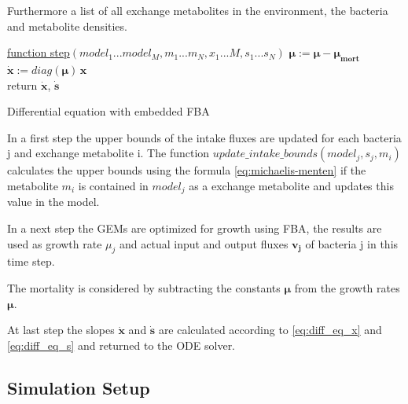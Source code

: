\documentclass[a4paper,10pt]{article}
\begin{document}
Furthermore a list of all exchange metabolites in the environment, the bacteria and metabolite densities.


\begin{algorithm}

    \underline{function step}$(model_1...model_M, m_1...m_N, x_1...M, s_1...s_N)$\;
    $\bm{\mu} := \bm{\mu} - \bm{\mu_{mort}}$\\
    $\dot{\bm{x}} := diag(\bm{\mu}) \, \bm{x}$\\
    return $\dot{\bm{x}}$, $\dot{\bm{s}}$
    \caption{Differential equation with embedded FBA}
    \label{alg:differential_equation_with_embedded_fba}
\end{algorithm}

In a first step the upper bounds of the intake fluxes are updated for each bacteria j and exchange metabolite i.
The function $update\_intake\_bounds(model_j, s_j, m_i)$ calculates the upper bounds using the formula \ref{eq:michaelis-menten} if
the metabolite $m_i$ is contained in $model_j$ as a exchange metabolite and updates this value in the model.

In a next step the GEMs are optimized for growth using FBA, the results are used as growth rate $\mu_j$ and actual input and output
fluxes $\bm{v_j}$ of bacteria j in this time step.

The mortality is considered by subtracting the constants $\bm{\mu}$ from the growth rates $\bm{\mu}$.

At last step the slopes $\dot{\bm{x}}$ and $\bm{\dot{s}}$ are calculated according to \ref{eq:diff_eq_x} and \ref{eq:diff_eq_s} and
returned to the ODE solver.

\subsection{Simulation Setup}
\end{document}
